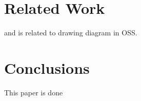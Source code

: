 \documentclass{sig-alternate}
\begin{document}
\section{Related Work}
\cite{Yatani2009} and \cite{Eunyoung2010} is related to drawing diagram in OSS.



\section{Conclusions}
This paper is done



\nocite{*}

\end{document}
